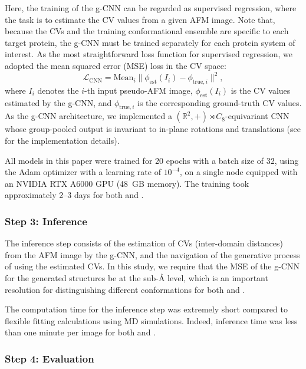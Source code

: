 Here, the training of the g-CNN can be regarded as supervised regression, where the task is to estimate the CV values from a given AFM image.
Note that, because the CVs and the training conformational ensemble are specific to each target protein, the g-CNN must be trained separately for each protein system of interest.
As the most straightforward loss function for supervised regression, we adopted the mean squared error (MSE) loss in the CV space:
\begin{equation}
    \mathcal{L}_{\text{CNN}} = \mathrm{Mean}_{i} \| \phi_{\text{est}}(I_i) - \phi_{\text{true}, i} \|^2,
    \label{eq:cnn-mse-loss}
\end{equation}
where $I_i$ denotes the $i$-th input pseudo-AFM image, $\phi_{\text{est}}(I_i)$ is the CV values estimated by the g-CNN, and $\phi_{\text{true}, i}$ is the corresponding ground-truth CV values. As the g-CNN architecture, we implemented a $(\mathbb{R}^2, +) \rtimes C_8$-equivariant CNN whose group-pooled output is invariant to in-plane rotations and translations (see  for the implementation details).

All models in this paper were trained for 20 epochs with a batch size of 32, using the Adam optimizer with a learning rate of $10^{-4}$, on a single node equipped with an NVIDIA RTX A6000 GPU (48~GB memory). 
The training took approximately 2--3 days for both \AK and \flhac.

\subsubsection{Step 3: Inference}

The inference step consists of the estimation of CVs (inter-domain distances) from the AFM image by the g-CNN, and the navigation of the generative process of \AFiii using the estimated CVs. 
In this study, we require that the MSE of the g-CNN for the generated structures be at the sub-\AA{} level, 
which is an important resolution for distinguishing different conformations for both \AK and \flhac. 

The computation time for the inference step was extremely short 
compared to flexible fitting calculations using MD simulations. 
Indeed, inference time was less than one minute per image for both \AK and \flhac.

\subsubsection{Step 4: Evaluation}
\label{subsubsec:evaluation}


